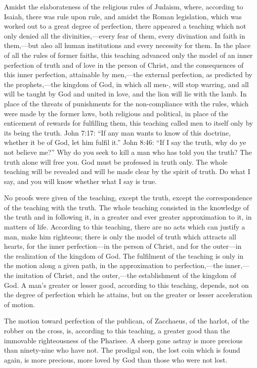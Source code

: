 \documentclass{book}
\begin{document}
Amidst the elaborateness of the religious rules of Judaism, where, according to Isaiah, there was rule upon rule, and amidst the Roman legislation, which was worked out to a great degree of perfection, there appeared a teaching which not only denied all the divinities,—every fear of them, every divination and faith in them,—but also all human institutions and every necessity for them. In the place of all the rules of former faiths, this teaching advanced only the model of an inner perfection of truth and of love in the person of Christ, and the consequences of this inner perfection, attainable by men,—the external perfection, as predicted by the prophets,—the kingdom of God, in which all men-, will stop warring, and all will be taught by God and united in love, and the lion will lie with the lamb. In place of the threats of punishments for the non-compliance with the rules, which were made by the former laws, both religious and political, in place of the enticement of rewards for fulfilling them, this teaching called men to itself only by its being the truth. John 7:17: “If any man wants to know of this doctrine, whether it be of God, let him fulfil it.” John 8:46: “If I say the truth, why do ye not believe me?” Why do you seek to kill a man who has told you the truth? The truth alone will free you. God must be professed in truth only. The whole teaching will be revealed and will be made clear by the spirit of truth. Do what I say, and you will know whether what I say is true.

No proofs were given of the teaching, except the truth, except the correspondence of the teaching with the truth. The whole teaching consisted in the knowledge of the truth and in following it, in a greater and ever greater approximation to it, in matters of life. According to this teaching, there are no acts which can justify a man, make him righteous; there is only the model of truth which attracts all hearts, for the inner perfection—in the person of Christ, and for the outer—in the realization of the kingdom of God. The fulfilment of the teaching is only in the motion along a given path, in the approximation to perfection,—the inner,—the imitation of Christ, and the outer,—the establishment of the kingdom of God. A man’s greater or lesser good, according to this teaching, depends, not on the degree of perfection which he attains, but on the greater or lesser acceleration of motion.

The motion toward perfection of the publican, of Zacchaeus, of the harlot, of the robber on the cross, is, according to this teaching, a greater good than the immovable righteousness of the Pharisee. A sheep gone astray is more precious than ninety-nine who have not. The prodigal son, the lost coin which is found again, is more precious, more loved by God than those who were not lost.
\end{document}

